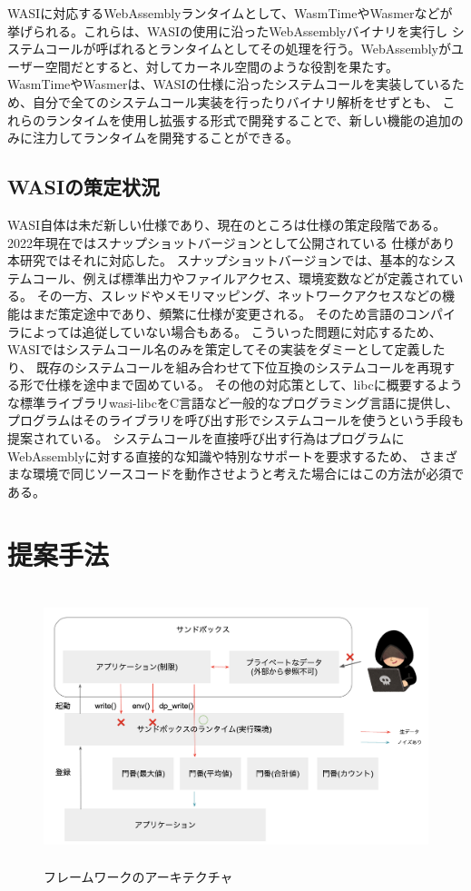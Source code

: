\documentclass[a4paper,11pt]{jreport}
\begin{document}
WASIに対応するWebAssemblyランタイムとして、WasmTime\cite{wasmtime}やWasmer\cite{wasmer}などが挙げられる。これらは、WASIの使用に沿ったWebAssemblyバイナリを実行し
システムコールが呼ばれるとランタイムとしてその処理を行う。WebAssemblyがユーザー空間だとすると、対してカーネル空間のような役割を果たす。
WasmTimeやWasmerは、WASIの仕様に沿ったシステムコールを実装しているため、自分で全てのシステムコール実装を行ったりバイナリ解析をせずとも、
これらのランタイムを使用し拡張する形式で開発することで、新しい機能の追加のみに注力してランタイムを開発することができる。

\section{WASIの策定状況}

WASI自体は未だ新しい仕様であり、現在のところは仕様の策定段階である。2022年現在ではスナップショットバージョンとして公開されている
仕様があり本研究ではそれに対応した。
スナップショットバージョンでは、基本的なシステムコール、例えば標準出力やファイルアクセス、環境変数などが定義されている。
その一方、スレッドやメモリマッピング、ネットワークアクセスなどの機能はまだ策定途中であり、頻繁に仕様が変更される。
そのため言語のコンパイラによっては追従していない場合もある。
こういった問題に対応するため、WASIではシステムコール名のみを策定してその実装をダミーとして定義したり\cite{wasi-pr-thread}、
既存のシステムコールを組み合わせて下位互換のシステムコールを再現する形\cite{wasi-issue-thread}で仕様を途中まで固めている。
その他の対応策として、libcに概要するような標準ライブラリwasi-libcをC言語など一般的なプログラミング言語に提供し、
プログラムはそのライブラリを呼び出す形でシステムコールを使うという手段も提案されている。
システムコールを直接呼び出す行為はプログラムにWebAssemblyに対する直接的な知識や特別なサポートを要求するため、
さまざまな環境で同じソースコードを動作させようと考えた場合にはこの方法が必須である。

\chapter{提案手法}

\begin{figure}[htbp]
    \centering
\includegraphics[height=80mm]{architecture2.png}
    \caption{フレームワークのアーキテクチャ}
    \label{fig:architecture}
\end{figure}
\end{document}
